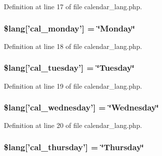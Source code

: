 Definition at line 17 of file calendar\-\_\-lang.\-php.

\hypertarget{calendar__lang_8php_a55fb324dcfcabd69cc212d116b6b0254}{
\subsubsection[{\$lang}]{\setlength{\rightskip}{0pt plus 5cm}\$lang\mbox{[}'cal\-\_\-monday'\mbox{]} = \char`\"{}Monday\char`\"{}}}\label{calendar__lang_8php_a55fb324dcfcabd69cc212d116b6b0254}


Definition at line 18 of file calendar\-\_\-lang.\-php.

\hypertarget{calendar__lang_8php_a2f395fc42eea1e44a77e77525b266061}{
\subsubsection[{\$lang}]{\setlength{\rightskip}{0pt plus 5cm}\$lang\mbox{[}'cal\-\_\-tuesday'\mbox{]} = \char`\"{}Tuesday\char`\"{}}}\label{calendar__lang_8php_a2f395fc42eea1e44a77e77525b266061}


Definition at line 19 of file calendar\-\_\-lang.\-php.

\hypertarget{calendar__lang_8php_a85c82aef005144770cf7356945a85819}{
\subsubsection[{\$lang}]{\setlength{\rightskip}{0pt plus 5cm}\$lang\mbox{[}'cal\-\_\-wednesday'\mbox{]} = \char`\"{}Wednesday\char`\"{}}}\label{calendar__lang_8php_a85c82aef005144770cf7356945a85819}


Definition at line 20 of file calendar\-\_\-lang.\-php.

\hypertarget{calendar__lang_8php_a3ab3ea291fddc8063b57a25cfbc7cf0f}{
\subsubsection[{\$lang}]{\setlength{\rightskip}{0pt plus 5cm}\$lang\mbox{[}'cal\-\_\-thursday'\mbox{]} = \char`\"{}Thursday\char`\"{}}}\label{calendar__lang_8php_a3ab3ea291fddc8063b57a25cfbc7cf0f}


